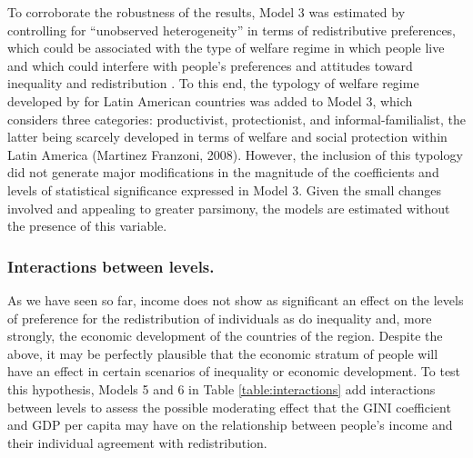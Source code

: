 \documentclass[utf8]{frontiersSCNS} %
\begin{document}
To corroborate the robustness of the results, Model 3 was estimated by controlling for “unobserved heterogeneity” in terms of redistributive preferences, which could be associated with the type of welfare regime in which people live and which could interfere with people’s preferences and attitudes toward inequality and redistribution \parencite{Schmidt-CatranEconomicinequalitypublic2016}. To this end, the typology of welfare regime developed by \textcite{MartinezFranzoniWelfareRegimesLatin2008} for Latin American countries was added to Model 3, which considers three categories: productivist, protectionist, and informal-familialist, the latter being scarcely developed in terms of welfare and social protection within Latin America (Martinez Franzoni, 2008). However, the inclusion of this typology did not generate major modifications in the magnitude of the coefficients and levels of statistical significance expressed in Model 3. Given the small changes involved and appealing to greater parsimony, the models are estimated without the presence of this variable.

\subsubsection{Interactions between levels.}

As we have seen so far, income does not show as significant an effect on the levels of preference for the redistribution of individuals as do inequality and, more strongly, the economic development of the countries of the region. Despite the above, it may be perfectly plausible that the economic stratum of people will have an effect in certain scenarios of inequality or economic development. To test this hypothesis, Models 5 and 6 in Table \ref{table:interactions} add interactions between levels to assess the possible moderating effect that the GINI coefficient and GDP per capita may have on the relationship between people’s income and their individual agreement with redistribution.
\end{document}
